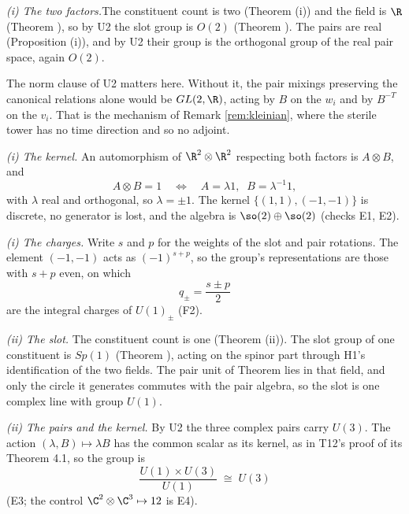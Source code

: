 \textit{(i) The two factors.}\enspace The constituent count is two (Theorem (i)) and the field is $\R$ (Theorem ), so by U2 the slot group is $O(2)$ (Theorem ). The pairs are real (Proposition (i)), and by U2 their group is the orthogonal group of the real pair space, again $O(2)$.

The norm clause of U2 matters here. Without it, the pair mixings preserving the canonical relations alone would be $GL(2,\R)$, acting by $B$ on the $w_{i}$ and by $B^{-T}$ on the $v_{i}$. That is the mechanism of Remark \ref{rem:kleinian}, where the sterile tower has no time direction and so no adjoint.



\emph{(i) The kernel.}  An automorphism of $\R^{2} \otimes \R^{2}$ respecting both factors is $A \otimes B$, and
\[
A \otimes B = 1 \quad\Longleftrightarrow\quad A = \lambda 1, \;\; B = \lambda^{-1}1,
\]
with $\lambda$ real and orthogonal, so $\lambda = \pm 1$. The kernel $\{(1,1), (-1,-1)\}$ is discrete, no generator is lost, and the algebra is $\so(2) \oplus \so(2)$ (checks E1, E2).



\emph{(i) The charges.}  Write $s$ and $p$ for the weights of the slot and pair rotations. The element $(-1, -1)$ acts as $(-1)^{s + p}$, so the group's representations are those with $s + p$ even, on which
\[
q_{\pm} = \frac{s \pm p}{2}
\]
are the integral charges of $U(1)_{\pm}$ (F2).



\emph{(ii) The slot.}  The constituent count is one (Theorem (ii)). The slot group of one constituent is $Sp(1)$ (Theorem ), acting on the spinor part through H1's identification of the two fields. The pair unit of Theorem  lies in that field, and only the circle it generates commutes with the pair algebra, so the slot is one complex line with group $U(1)$.



\emph{(ii) The pairs and the kernel.}  By U2 the three complex pairs carry $U(3)$. The action $(\lambda, B) \mapsto \lambda B$ has the common scalar as its kernel, as in T12's proof of its Theorem 4.1, so the group is
\[
\frac{U(1) \times U(3)}{U(1)} \;\cong\; U(3)
\]
(E3; the control $\C^{2} \otimes \C^{3} \mapsto 12$ is E4).
